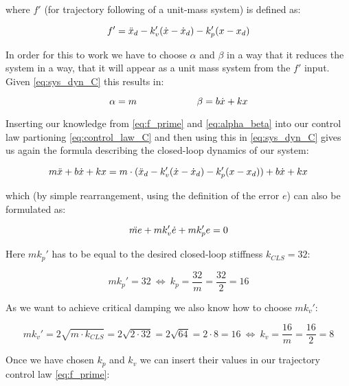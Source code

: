 \documentclass[a4paper,10pt]{article}
\begin{document}
where $f'$ (for trajectory following of a unit-mass system) is defined as:

\begin{equation}\label{eq:f_prime}
f' = \Ddot{x}_d - k_v'(\Dot{x} - \Dot{x}_d) - k_p'(x - x_d)
\end{equation}

In order for this to work we have to choose $\alpha$ and $\beta$ in a way that it reduces the system in a way, that it will appear as a unit mass system from the $f'$ input. Given \eqref{eq:sys_dyn_C} this results in:

\begin{equation}\label{eq:alpha_beta}
\alpha = m \hspace{22mm} \beta = b\Dot{x} + kx
\end{equation}

Inserting our knowledge from \eqref{eq:f_prime} and \eqref{eq:alpha_beta} into our control law partioning \eqref{eq:control_law_C} and then using this in \eqref{eq:sys_dyn_C} gives us again the formula describing the closed-loop dynamics of our system:

\begin{equation}
m\Ddot{x} + b\Dot{x} + kx = m \cdot (\Ddot{x}_d - k_v'(\Dot{x} - \Dot{x}_d) - k_p'(x - x_d)) + b\Dot{x} + kx
\end{equation}

which (by simple rearrangement, using the definition of the error $e$) can also be formulated as:

\begin{equation}\label{eq:closed_loop}
\Ddot{me} + mk_v'\Dot{e} + mk_p'e = 0
\end{equation}

Here $mk_p'$ has to be equal to the desired closed-loop stiffness $k_{CLS} = 32$:

\begin{equation}
mk_p' = 32~\Longleftrightarrow~k_p = \frac{32}{m} = \frac{32}{2} = 16
\end{equation}

As we want to achieve critical damping we also know how to choose $mk_v'$:

\begin{equation}
mk_v' = 2\sqrt{m \cdot k_{CLS}} = 2\sqrt{2 \cdot 32} = 2\sqrt{64} = 2 \cdot 8 = 16~\Longleftrightarrow~k_v = \frac{16}{m} = \frac{16}{2} = 8
\end{equation}

Once we have chosen $k_p$ and $k_v$ we can insert their values in our trajectory control law \eqref{eq:f_prime}:
\end{document}
